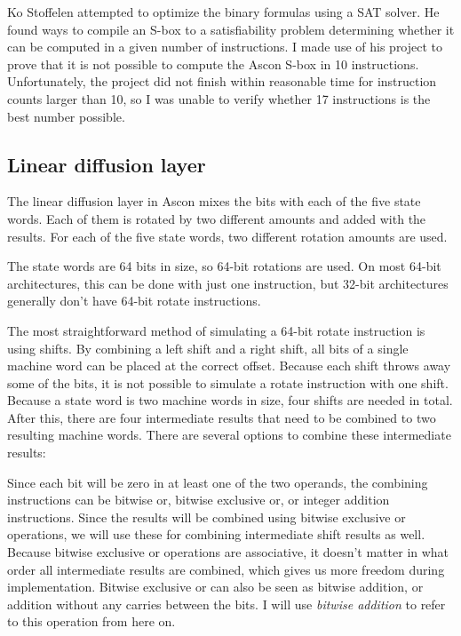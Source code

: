 Ko Stoffelen\cite{sat} attempted to optimize the binary formulas using a SAT
solver. He found ways to compile an S-box to a satisfiability problem
determining whether it can be computed in a given number of instructions. I made
use of his project to prove that it is not possible to compute the Ascon S-box
in 10 instructions. Unfortunately, the project did not finish within reasonable
time for instruction counts larger than 10, so I was unable to verify whether 17
instructions is the best number possible.

\subsection{Linear diffusion layer}

The linear diffusion layer in Ascon mixes the bits with each of the five state
words. Each of them is rotated by two different amounts and added with the
results. For each of the five state words, two different rotation amounts are
used.

The state words are 64 bits in size, so 64-bit rotations are used. On most
64-bit architectures, this can be done with just one instruction, but 32-bit
architectures generally don't have 64-bit rotate instructions.

The most straightforward method of simulating a 64-bit rotate instruction is
using shifts. By combining a left shift and a right shift, all bits of a single
machine word can be placed at the correct offset. Because each shift throws
away some of the bits, it is not possible to simulate a rotate instruction with
one shift. Because a state word is two machine words in size, four shifts are
needed in total. After this, there are four intermediate results that need to be
combined to two resulting machine words. There are several options to combine
these intermediate results:

Since each bit will be zero in at least one of the two operands, the combining
instructions can be bitwise or, bitwise exclusive or, or integer addition
instructions. Since the results will be combined using bitwise exclusive or
operations, we will use these for combining intermediate shift results as well.
Because bitwise exclusive or operations are associative, it doesn't matter in
what order all intermediate results are combined, which gives us more freedom
during implementation. Bitwise exclusive or can also be seen as bitwise
addition, or addition without any carries between the bits. I will use
\emph{bitwise addition} to refer to this operation from here on.


